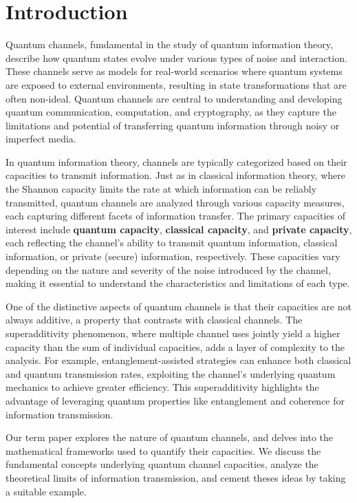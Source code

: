 \section{Introduction}

Quantum channels, fundamental in the study of quantum information theory,
describe how quantum states evolve under various types of noise and interaction.
These channels serve as models for real-world scenarios where quantum systems
are exposed to external environments, resulting in state transformations that
are often non-ideal. Quantum channels are central to understanding and developing
quantum communication, computation, and cryptography, as they capture the
limitations and potential of transferring quantum information through noisy or
imperfect media.

In quantum information theory, channels are typically categorized based on their
capacities to transmit information. Just as in classical information theory, where
the Shannon capacity limits the rate at which information can be reliably transmitted,
quantum channels are analyzed through various capacity measures, each capturing
different facets of information transfer. The primary capacities of interest include
\textbf{quantum capacity}, \textbf{classical capacity}, and \textbf{private capacity},
each reflecting the channel's ability to transmit quantum information, classical
information, or private (secure) information, respectively. These capacities vary
depending on the nature and severity of the noise introduced by the channel, making
it essential to understand the characteristics and limitations of each type.

One of the distinctive aspects of quantum channels is that their capacities are not
always additive, a property that contrasts with classical channels. The superadditivity
phenomenon, where multiple channel uses jointly yield a higher capacity than the sum of
individual capacities, adds a layer of complexity to the analysis. For example,
entanglement-assisted strategies can enhance both classical and quantum transmission rates,
exploiting the channel's underlying quantum mechanics to achieve greater efficiency. This
superadditivity highlights the advantage of leveraging quantum properties like entanglement
and coherence for information transmission.

Our term paper explores the nature of quantum channels, and delves into the mathematical
frameworks used to quantify their capacities. We discuss the fundamental concepts underlying
quantum channel capacities, analyze the theoretical limits of information transmission, and
cement theses ideas by taking a suitable example.


